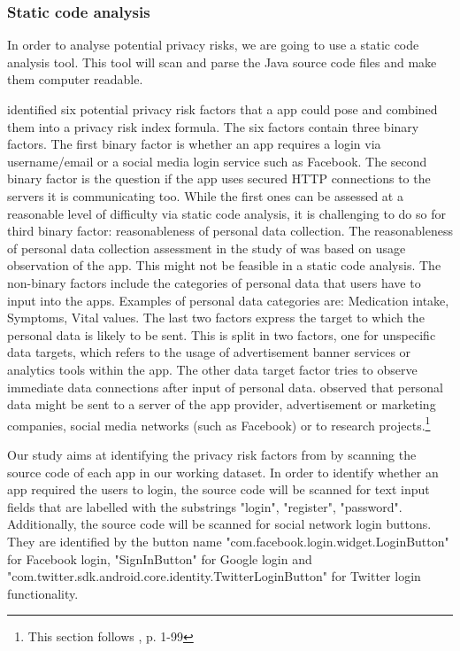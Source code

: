 \documentclass[
	a4paper,
	oneside,
	12pt,
	liststotocnumbered
]{article}
\let\cite\textcite
\begin{document}
\subsubsection{Static code analysis}
In order to analyse potential privacy risks, we are going to use a static code analysis tool.
This tool will scan and parse the Java source code files and make them computer readable.

\cite{Bruggemann2016} identified six potential privacy risk factors that a \mH app could pose and combined them into a privacy risk index formula. 
The six factors contain three binary factors.
The first binary factor is whether an app requires a login via username/email or a social media login service such as Facebook. 
The second binary factor is the question if the app uses secured \acs{HTTP} connections to the servers it is communicating too.
While the first ones can be assessed at a reasonable level of difficulty via static code analysis, it is challenging to do so for third binary factor: reasonableness of personal data collection. 
The reasonableness of personal data collection assessment in the study of \cite{Bruggemann2016} was based on usage observation of the app. This might not be feasible in a static code analysis.
The non-binary factors include the categories of personal data that users have to input into the \mH apps. Examples of personal data categories are: Medication intake, Symptoms, Vital values.
The last two factors express the target to which the personal data is likely to be sent. 
This is split in two factors, one for unspecific data targets, which refers to the usage of advertisement banner services or analytics tools within the app. 
The other data target factor tries to observe immediate data connections after input of personal data. 
\cite{Bruggemann2016} observed that personal data might be sent to a server of the app provider, advertisement or marketing companies, social media networks (such as Facebook) or to research projects.\footnote{This section follows \cite{Bruggemann2016}, p. 1-99}

Our study aims at identifying the privacy risk factors from \cite{Bruggemann2016} by scanning the source code of each app in our working dataset. 
In order to identify whether an app required the users to login, the source code will be scanned for text input fields that are labelled with the substrings "login", "register", "password". 
Additionally, the source code will be scanned for social network login buttons.
They are identified by the button name "com.facebook.login.widget.LoginButton" for Facebook login, "SignInButton" for Google login and "com.twitter.sdk.android.core.identity.TwitterLoginButton" for Twitter login functionality.
\end{document}
